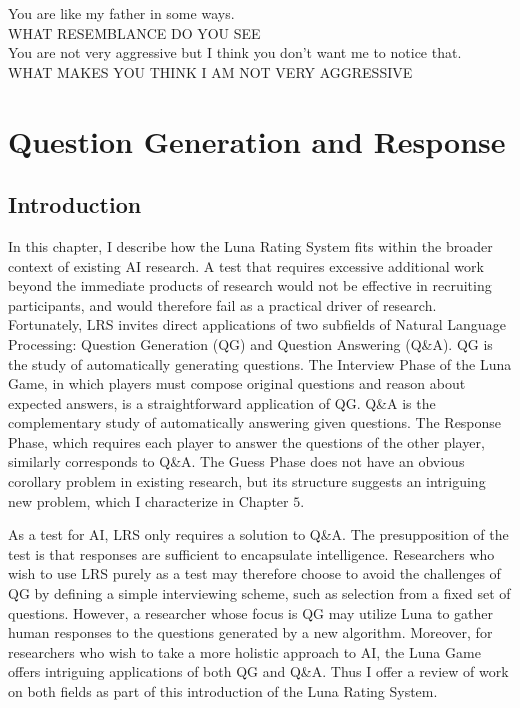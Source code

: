 \begin{savequote}[75mm]
You are like my father in some ways.\\
WHAT RESEMBLANCE DO YOU SEE\\
You are not very aggressive but I think you don't want me to notice that.\\
WHAT MAKES YOU THINK I AM NOT VERY AGGRESSIVE
\end{savequote}
\chapter{Question Generation and Response}

\section{Introduction}

In this chapter, I describe how the Luna Rating System fits within the broader context of existing AI research. A test that requires excessive additional work beyond the immediate products of research would not be effective in recruiting participants, and would therefore fail as a practical driver of research. Fortunately, LRS invites direct applications of two subfields of Natural Language Processing: Question Generation (QG) and Question Answering (Q\&A). QG is the study of automatically generating questions. The Interview Phase of the Luna Game, in which players must compose original questions and reason about expected answers, is a straightforward application of QG. Q\&A is the complementary study of automatically answering given questions. The Response Phase, which requires each player to answer the questions of the other player, similarly corresponds to Q\&A. The Guess Phase does not have an obvious corollary problem in existing research, but its structure suggests an intriguing new problem, which I characterize in Chapter $5$.

As a test for AI, LRS only requires a solution to Q\&A. The presupposition of the test is that responses are sufficient to encapsulate intelligence. Researchers who wish to use LRS purely as a test may therefore choose to avoid the challenges of QG by defining a simple interviewing scheme, such as selection from a fixed set of questions. However, a researcher whose focus is QG may utilize Luna to gather human responses to the questions generated by a new algorithm. Moreover, for researchers who wish to take a more holistic approach to AI, the Luna Game offers intriguing applications of both QG and Q\&A. Thus I offer a review of work on both fields as part of this introduction of the Luna Rating System.

